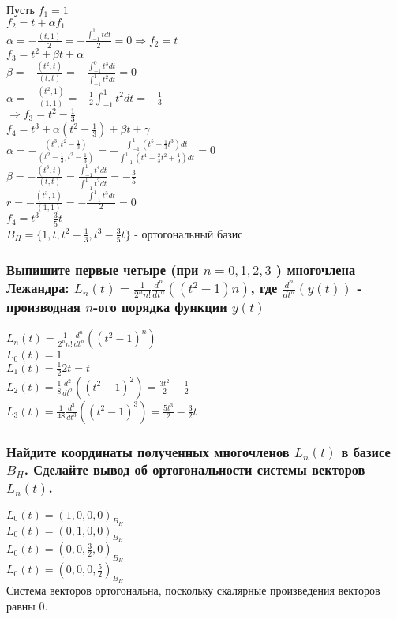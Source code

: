 \documentclass{article}
\begin{document}
    Пусть $f_1 = 1$\\
    $f_2 = t + \alpha f_1$\\
    $\alpha = - \frac{(t, 1)}{2} = - \frac{\int_{-1}^1 t dt}{2} = 0 \Rightarrow f_2 = t$\\
    $f_3 = t^2 + \beta t + \alpha$\\
    $\beta = - \frac{(t^2, t)}{(t, t)} = - \frac{\int_{-1}^0 t^3 dt}{\int_{-1}^1 t^2 dt} = 0$\\
    $\alpha = - \frac{(t^2, 1)}{(1, 1)} = -\frac{1}{2} \int_{-1}^1 t^2 dt = - \frac{1}{3}$\\
    $\Rightarrow f_3 = t^2 - \frac{1}{3}$\\
    $f_4 = t^3 + \alpha(t^2 - \frac{1}{3}) + \beta t + \gamma$\\
    $\alpha = - \frac{(t^3, t^2 - \frac{1}{3})}{(t^2 - \frac{1}{3}, t^2 - \frac{1}{3})} = - \frac{\int_{-1}^1 (t^5 - \frac{1}{3}t^3) dt}{\int_{-1}^1 (t^4 - \frac{2}{3}t^2 + \frac{1}{9}) dt} = 0$\\
    $\beta = - \frac{(t^3, t)}{(t, t)} = \frac{\int_{-1}^1 t^4 dt}{\int_{-1}^1 t^2 dt} = - \frac{3}{5}$\\
    $r = - \frac{(t^3, 1)}{(1, 1)} = - \frac{\int_{-1}^1 t^3 dt}{2} = 0$\\
    $f_4 = t^3 - \frac{3}{5} t$\\
    $B_H = \{1, t, t^2 - \frac{1}{3}, t^3 - \frac{3}{5}t\}$ - ортогональный базис
    
    \subsubsection{Выпишите первые четыре (при $n = 0, 1, 2, 3$ ) многочлена Лежандра: $L_n (t) = \frac{1}{2^n n!} \frac{d^n}{dt^n}((t^2-1)n)$, 
    где $\frac{d^n}{dt^n} (y(t))$ - производная $n$-ого порядка функции $y(t)$}
    $L_n (t) = \frac{1}{2^n n!} \frac{d^n}{dt^n} ((t^2-1)^n)$\\
    $L_0 (t) = 1$\\
    $L_1 (t) = \frac{1}{2} 2t = t$\\
    $L_2 (t) = \frac{1}{8} \frac{d^2}{dt^2}((t^2-1)^2) = \frac{3t^2}{2} - \frac{1}{2}$\\
    $L_3 (t) = \frac{1}{48} \frac{d^3}{dt^3}((t^2-1)^3) = \frac{5t^3}{2} - \frac{3}{2}t$
    
    \subsubsection{Найдите координаты полученных многочленов $L_n(t)$ в базисе $B_H$. Сделайте вывод об ортогональности системы векторов $L_n(t)$.}
    $L_0 (t) = (1, 0, 0, 0)_{B_H}$\\
    $L_0 (t) = (0, 1, 0, 0)_{B_H}$\\
    $L_0 (t) = (0, 0, \frac{3}{2}, 0)_{B_H}$\\
    $L_0 (t) = (0, 0, 0, \frac{5}{2})_{B_H}$\\
    Система векторов ортогональна, поскольку скалярные произведения векторов равны 0.
    
\end{document}

